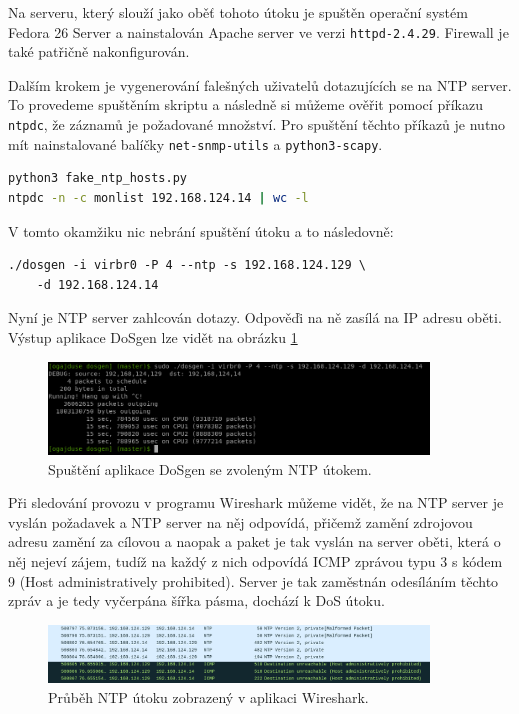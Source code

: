 Na serveru, který slouží jako oběť tohoto útoku je spuštěn operační systém Fedora 26 Server a nainstalován Apache server ve verzi \texttt{httpd-2.4.29}. Firewall je také patřičně nakonfigurován.

Dalším krokem je vygenerování falešných uživatelů dotazujících se na NTP server. To provedeme spuštěním skriptu a následně si můžeme ověřit pomocí příkazu \texttt{ntpdc}, že záznamů je požadované množství. Pro spuštění těchto příkazů je nutno mít nainstalované balíčky \texttt{net-snmp-utils} a \texttt{python3-scapy}.

\begin{lstlisting}[language=bash]
python3 fake_ntp_hosts.py
ntpdc -n -c monlist 192.168.124.14 | wc -l
\end{lstlisting}

\noindent V tomto okamžiku nic nebrání spuštění útoku a to následovně:
\begin{lstlisting}
./dosgen -i virbr0 -P 4 --ntp -s 192.168.124.129 \
	-d 192.168.124.14
\end{lstlisting}

Nyní je NTP server zahlcován dotazy. Odpověďi na ně zasílá na IP adresu oběti. Výstup aplikace DoSgen lze vidět na obrázku \ref{fig:dosgen_run_ntp-img}

\begin{figure} [ht]
	\centering
	\includegraphics[width=0.9\textwidth]{obrazky/dosgen_terminal_run_ntp.png}
	\caption{Spuštění aplikace DoSgen se zvoleným NTP útokem.}
	\label{fig:dosgen_run_ntp-img}
\end{figure}

Při sledování provozu v programu Wireshark můžeme vidět, že na NTP server je vyslán požadavek  a NTP server na něj odpovídá, přičemž zamění zdrojovou adresu zamění za cílovou a naopak a paket je tak vyslán na server oběti, která o něj nejeví zájem, tudíž na každý z nich odpovídá ICMP zprávou typu 3 s kódem 9 (Host administratively prohibited). Server je tak zaměstnán odesíláním těchto zpráv a je tedy vyčerpána šířka pásma, dochází k DoS útoku.

\begin{figure} [h]
	\centering
	\includegraphics[width=0.9\textwidth]
	{obrazky/mon_getlist_1_wireshark_with_icmp_and_reply.png}
	\caption{Průběh NTP útoku zobrazený v  aplikaci Wireshark.}
	\label{fig:mon_getlist_1_wireshark_with_icmp_and_reply-img}
\end{figure}

